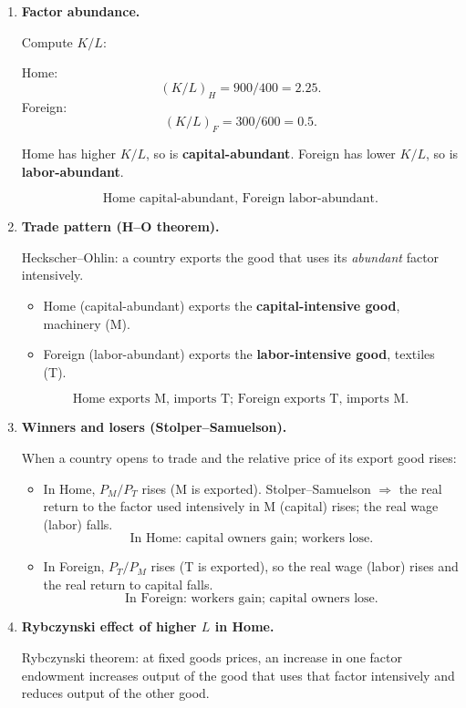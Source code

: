 \documentclass[12pt]{article}
\begin{document}
\begin{enumerate}[label=(\arabic*)]

\item \textbf{Factor abundance.}

Compute $K/L$:

Home:
\[
(K/L)_H = 900/400 = 2.25.
\]
Foreign:
\[
(K/L)_F = 300/600 = 0.5.
\]

Home has higher $K/L$, so is \textbf{capital-abundant}.  
Foreign has lower $K/L$, so is \textbf{labor-abundant}.

\[
\boxed{\text{Home capital-abundant, Foreign labor-abundant.}}
\]

\item \textbf{Trade pattern (H--O theorem).}

Heckscher–Ohlin: a country exports the good that uses its \emph{abundant} factor intensively.

\begin{itemize}
\item Home (capital-abundant) exports the \textbf{capital-intensive good}, machinery (M).
\item Foreign (labor-abundant) exports the \textbf{labor-intensive good}, textiles (T).
\end{itemize}

\[
\boxed{\text{Home exports M, imports T; Foreign exports T, imports M.}}
\]

\item \textbf{Winners and losers (Stolper–Samuelson).}

When a country opens to trade and the relative price of its export good rises:

\begin{itemize}
\item In Home, $P_M/P_T$ rises (M is exported).  
  Stolper–Samuelson $\Rightarrow$ the real return to the factor used intensively in M (capital) rises; the real wage (labor) falls.
  \[
  \boxed{\text{In Home: capital owners gain; workers lose.}}
  \]
\item In Foreign, $P_T/P_M$ rises (T is exported), so the real wage (labor) rises and the real return to capital falls.
  \[
  \boxed{\text{In Foreign: workers gain; capital owners lose.}}
  \]
\end{itemize}

\item \textbf{Rybczynski effect of higher $L$ in Home.}

Rybczynski theorem: at fixed goods prices, an increase in one factor endowment increases output of the good that uses that factor intensively and reduces output of the other good.


\end{enumerate}
\end{document}
